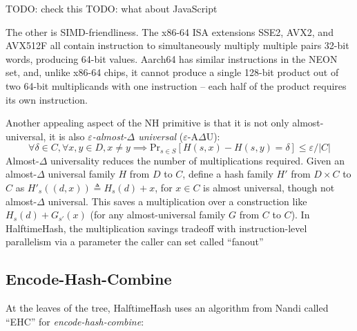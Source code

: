 \documentclass[sigconf, nonacm]{acmart}
\begin{document}
TODO: check this
TODO: what about JavaScript

The other is SIMD-friendliness.
The x86-64 ISA extensions SSE2, AVX2, and AVX512F all contain instruction to simultaneously multiply multiple pairs 32-bit words, producing 64-bit values.
Aarch64 has similar instructions in the NEON set, and, unlike x86-64 chips, it cannot produce a single 128-bit product out of two 64-bit multiplicands with one instruction -- each half of the product requires its own instruction.



Another appealing aspect of the NH primitive is that it is not only almost-universal, it is also {\em$ \varepsilon$-almost-$\Delta$ universal} ($\varepsilon$-A$\Delta$U):
\[\forall \delta \in C, \forall x,y \in D, x \neq y \implies \mathrm{Pr}_{s \in S}[H(s, x) - H(s, y) = \delta] \leq \varepsilon / |C|\]
Almost-$\Delta$ universality reduces the number of multiplications required.
Given an almost-$\Delta$ universal family $H$ from $D$ to $C$, define a hash family $H'$ from $D \times C$ to $C$ as $H'_s ((d, x)) \triangleq H_s(d) + x$, for $x \in C$ is almost universal, though not almost-$\Delta$ universal.
This saves a multiplication over a construction like $H_s(d) + G_{s'}(x)$ (for any almost-universal family $G$ from $C$ to $C$).
In HalftimeHash, the multiplication savings tradeoff with instruction-level parallelism via a parameter the caller can set called ``fanout''


\subsection{Encode-Hash-Combine}

At the leaves of the tree, HalftimeHash uses an algorithm from Nandi called ``EHC'' for {\em encode-hash-combine}: \cite{ehc-nandi}
\end{document}
